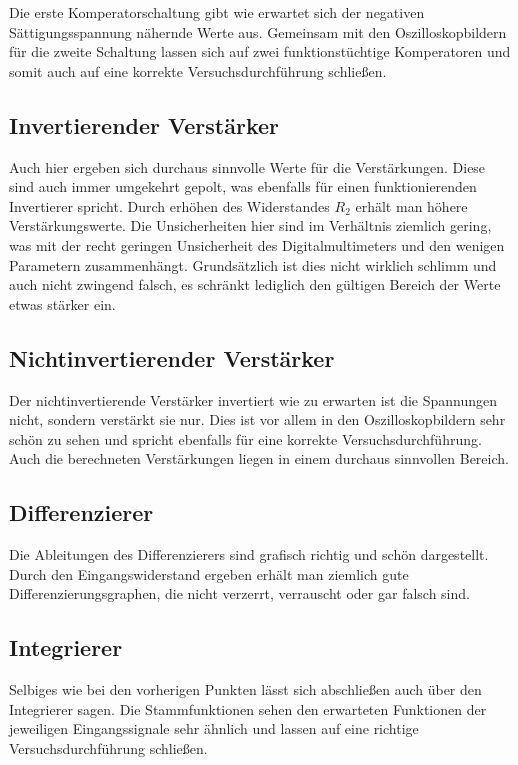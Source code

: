 \documentclass[12pt,a4paper,twoside]{article}
\begin{document}
Die erste Komperatorschaltung gibt wie erwartet sich der negativen Sättigungsspannung nähernde Werte aus. Gemeinsam mit den Oszilloskopbildern für die zweite Schaltung lassen sich auf zwei funktionstüchtige Komperatoren und somit auch auf eine korrekte Versuchsdurchführung schließen.

\subsection{Invertierender Verstärker}

Auch hier ergeben sich durchaus sinnvolle Werte für die Verstärkungen. Diese sind auch immer umgekehrt gepolt, was ebenfalls für einen funktionierenden Invertierer spricht. Durch erhöhen des Widerstandes $R_{2}$ erhält man höhere Verstärkungswerte.
Die Unsicherheiten hier sind im Verhältnis ziemlich gering, was mit der recht geringen Unsicherheit des Digitalmultimeters und den wenigen Parametern zusammenhängt.
Grundsätzlich ist dies nicht wirklich schlimm und auch nicht zwingend falsch, es schränkt lediglich den gültigen Bereich der Werte etwas stärker ein. 

\subsection{Nichtinvertierender Verstärker}

Der nichtinvertierende Verstärker invertiert wie zu erwarten ist die Spannungen nicht, sondern verstärkt sie nur. Dies ist vor allem in den Oszilloskopbildern sehr schön zu sehen und spricht ebenfalls für eine korrekte Versuchsdurchführung.
Auch die berechneten Verstärkungen liegen in einem durchaus sinnvollen Bereich.

\subsection{Differenzierer}

Die Ableitungen des Differenzierers sind grafisch richtig und schön dargestellt. Durch den Eingangswiderstand ergeben erhält man ziemlich gute Differenzierungsgraphen, die nicht verzerrt, verrauscht oder gar falsch sind.

\subsection{Integrierer}

Selbiges wie bei den vorherigen Punkten lässt sich abschließen auch über den Integrierer sagen. Die Stammfunktionen sehen den erwarteten Funktionen der jeweiligen Eingangssignale sehr ähnlich und lassen auf eine richtige Versuchsdurchführung schließen.
\end{document}
